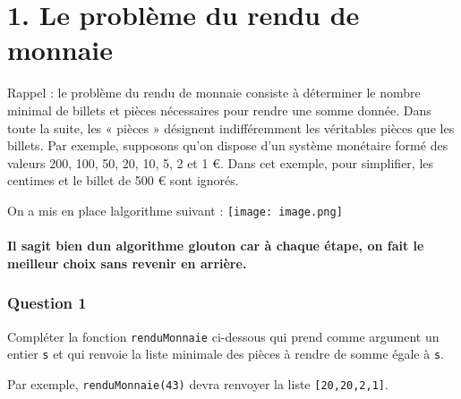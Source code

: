 \documentclass[
  paper=a4,
  ,captions=tableheading
]{scrartcl}
\author{}
\date{}
\title{}
\author{}
\date{}
\begin{document}




\hypertarget{1-le-probluxe8me-du-rendu-de-monnaie}{%
\section{1. Le problème du rendu de
monnaie}\label{1-le-probluxe8me-du-rendu-de-monnaie}}

Rappel : le problème du rendu de monnaie consiste à déterminer le nombre
minimal de billets et pièces nécessaires pour rendre une somme donnée.
Dans toute la suite, les « pièces » désignent indifféremment les
véritables pièces que les billets. Par exemple, supposons qu'on dispose
d'un système monétaire formé des valeurs 200, 100, 50, 20, 10, 5, 2 et 1
€. Dans cet exemple, pour simplifier, les centimes et le billet de 500 €
sont ignorés.

On a mis en place l\textquotesingle algorithme suivant :
\texttt{[image: image.png]}

\hypertarget{il-sagit-bien-dun-algorithme-glouton-car-uxe0-chaque-uxe9tape-on-fait-le-meilleur-choix-sans-revenir-en-arriuxe8re}{%
\paragraph{Il s\textquotesingle agit bien d\textquotesingle un
algorithme glouton car à chaque étape, on fait le meilleur choix sans
revenir en
arrière.}\label{il-sagit-bien-dun-algorithme-glouton-car-uxe0-chaque-uxe9tape-on-fait-le-meilleur-choix-sans-revenir-en-arriuxe8re}}

\hypertarget{question-1}{%
\subsubsection{Question 1}\label{question-1}}

Compléter la fonction \texttt{renduMonnaie} ci-dessous qui prend comme
argument un entier \texttt{s} et qui renvoie la liste minimale des
pièces à rendre de somme égale à \texttt{s}.

Par exemple, \texttt{renduMonnaie(43)} devra renvoyer la liste
\texttt{{[}20,20,2,1{]}}.
\end{document}
